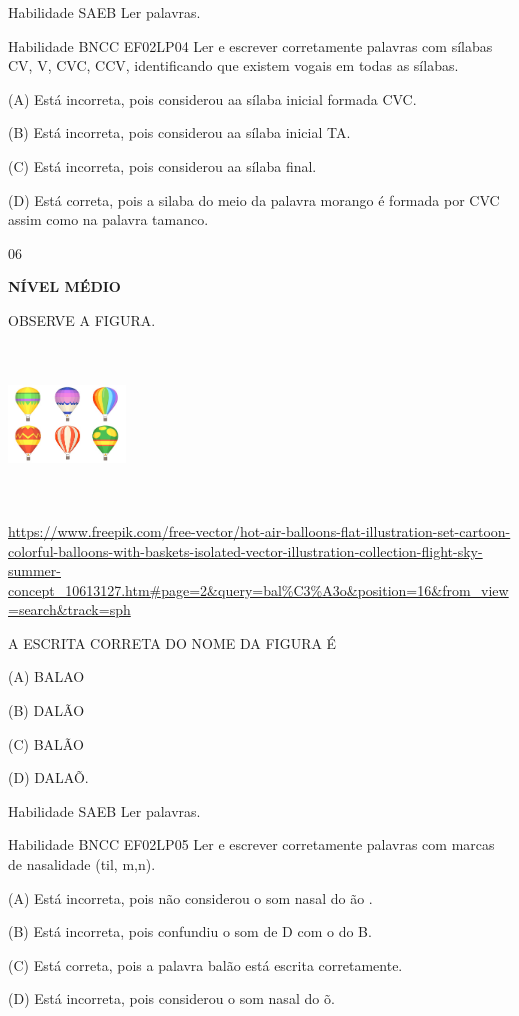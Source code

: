 {{Habilidade SAEB Ler palavras.

Habilidade BNCC EF02LP04 Ler e escrever corretamente palavras com
sílabas CV, V, CVC, CCV, identificando que existem vogais em todas as
sílabas.

(A) Está incorreta, pois considerou aa sílaba inicial formada CVC.

(B) Está incorreta, pois considerou aa sílaba inicial TA.

(C) Está incorreta, pois considerou aa sílaba final.

(D) Está correta, pois a silaba do meio da palavra morango é formada por
CVC assim como na palavra tamanco.

\num{06}

\textbf{NÍVEL MÉDIO}

OBSERVE A FIGURA.

\includegraphics[width=1.22569in,height=1.65417in]{media/image167.jpeg}

\url{https://www.freepik.com/free-vector/hot-air-balloons-flat-illustration-set-cartoon-colorful-balloons-with-baskets-isolated-vector-illustration-collection-flight-sky-summer-concept_10613127.htm\#page=2\&query=bal\%C3\%A3o\&position=16\&from_view=search\&track=sph}

A ESCRITA CORRETA DO NOME DA FIGURA É

(A) BALAO

(B) DALÃO

(C) BALÃO

(D) DALAÕ.

Habilidade SAEB Ler palavras.

Habilidade BNCC EF02LP05 Ler e escrever corretamente palavras com marcas
de nasalidade (til, m,n).

(A) Está incorreta, pois não considerou o som nasal do ão .

(B) Está incorreta, pois confundiu o som de D com o do B.

(C) Está correta, pois a palavra balão está escrita corretamente.

(D) Está incorreta, pois considerou o som nasal do õ.

}}
